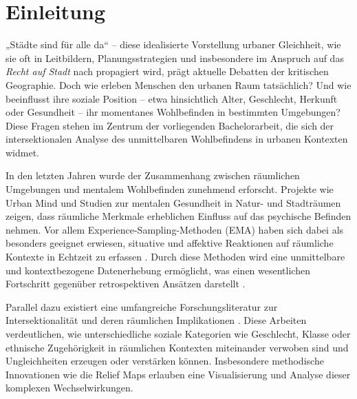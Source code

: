 \section{Einleitung}

„Städte sind für alle da“ – diese idealisierte Vorstellung urbaner Gleichheit, wie sie oft in Leitbildern, Planungsstrategien und insbesondere im Anspruch auf das \emph{Recht auf Stadt} nach \textcite{lefebvreDroitVille1967} propagiert wird, prägt aktuelle Debatten der kritischen Geographie. Doch wie erleben Menschen den urbanen Raum tatsächlich? Und wie beeinflusst ihre soziale Position – etwa hinsichtlich Alter, Geschlecht, Herkunft oder Gesundheit – ihr momentanes Wohlbefinden in bestimmten Umgebungen? Diese Fragen stehen im Zentrum der vorliegenden Bachelorarbeit, die sich der intersektionalen Analyse des unmittelbaren Wohlbefindens in urbanen Kontexten widmet.

In den letzten Jahren wurde der Zusammenhang zwischen räumlichen Umgebungen und mentalem Wohlbefinden zunehmend erforscht. Projekte wie Urban Mind \parencite{bakolisUrbanMindUsing2018} und Studien zur mentalen Gesundheit in Natur- und Stadträumen \parencite{bergouMentalHealthBenefits2022, hammoudSmartphonebasedEcologicalMomentary2024} zeigen, dass räumliche Merkmale erheblichen Einfluss auf das psychische Befinden nehmen. Vor allem Experience-Sampling-Methoden (EMA) haben sich dabei als besonders geeignet erwiesen, situative und affektive Reaktionen auf räumliche Kontexte in Echtzeit zu erfassen \parencite[vgl.][]{shiffmanEcologicalMomentaryAssessment2008, stoneEcologicalMomentaryAssessment1994, kirchnerSpatiotemporalDeterminantsMental2016}. Durch diese Methoden wird eine unmittelbare und kontextbezogene Datenerhebung ermöglicht, was einen wesentlichen Fortschritt gegenüber retrospektiven Ansätzen darstellt \parencite{kahnemanDevelopmentsMeasurementSubjective2006}.

Parallel dazu existiert eine umfangreiche Forschungsliteratur zur Intersektionalität und deren räumlichen Implikationen \parencite[vgl.][]{crenshawMappingMarginsIntersectionality1991, rodo-de-zarateDevelopingGeographiesIntersectionality2014, rodo-de-zarateYoungLesbiansNegotiating2015, rodo-de-zarateIntersectionalityFeministGeographies2018}. Diese Arbeiten verdeutlichen, wie unterschiedliche soziale Kategorien wie Geschlecht, Klasse oder ethnische Zugehörigkeit in räumlichen Kontexten miteinander verwoben sind und Ungleichheiten erzeugen oder verstärken können. Insbesondere methodische Innovationen wie die Relief Maps \parencite{rodo-de-zarateDevelopingGeographiesIntersectionality2014} erlauben eine Visualisierung und Analyse dieser komplexen Wechselwirkungen.


